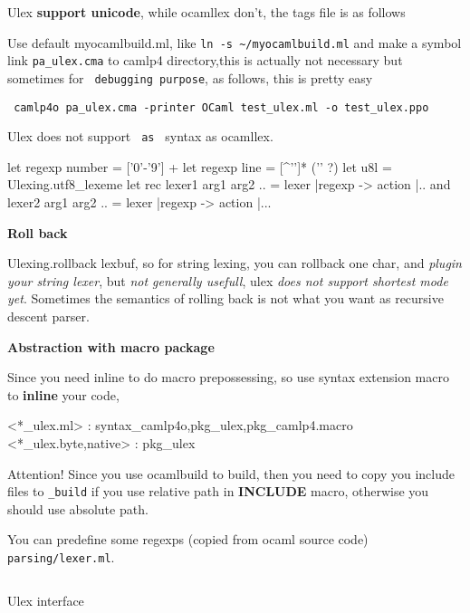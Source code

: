 
Ulex \textbf{ support unicode}, while ocamllex don't, the tags file is
as follows


Use default myocamlbuild.ml, like \verb|ln -s ~/myocamlbuild.ml| and
make a symbol link \verb|pa_ulex.cma| to camlp4 directory,this is
actually not necessary but sometimes for \verb| debugging purpose|,
as follows, this is pretty easy 

 \verb| camlp4o pa_ulex.cma -printer OCaml test_ulex.ml -o test_ulex.ppo|


Ulex does not support \verb| as | syntax as ocamllex.

\begin{redcode} 
let regexp number = ['0'-'9'] + 
let regexp line = [^'\n']* ('\n' ?)  
let u8l = Ulexing.utf8_lexeme 
let rec lexer1 arg1 arg2 .. = lexer 
   |regexp -> action |..  
and lexer2 arg1 arg2 .. = lexer
   |regexp -> action |...
\end{redcode}

\textbf{Roll back} 

Ulexing.rollback lexbuf, so for string lexing, you
can rollback one char, and \textit{plugin your string lexer}, but
\textit{not generally usefull}, ulex \textit{does not support shortest
mode yet}. Sometimes the semantics of rolling back is not what you
want as recursive descent parser.

\textbf{Abstraction with macro package} 

Since you need inline to do
macro prepossessing, so use syntax extension macro to \textbf{ inline}
your code,


\begin{bluetext}
 <*_ulex.ml> : syntax_camlp4o,pkg_ulex,pkg_camlp4.macro
 <*_ulex.{byte,native}> : pkg_ulex
\end{bluetext}

Attention!  Since you use ocamlbuild to build, then you need to copy
you include files to \verb|_build| if you use relative path in
\textbf{INCLUDE} macro, otherwise you should use absolute path.

 You can predefine some regexps (copied from ocaml source code)
\verb| parsing/lexer.ml|.

\inputminted{ocaml}{/Users/bobzhang1988/predefine_ulex.ml}


Ulex interface

